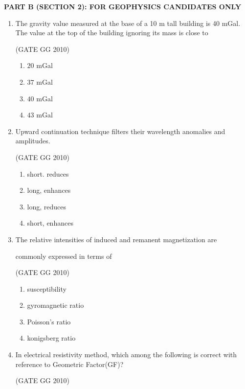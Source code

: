 \documentclass[journal]{IEEEtran}
\begin{document}
\vspace{1cm}
\textbf{PART B (SECTION 2): FOR GEOPHYSICS CANDIDATES ONLY}
\begin{enumerate}[start=26]
    \item The gravity value measured at the base of a 10 m tall building is 40 mGal. The value at the top of the building ignoring its mass is close to
    
\hfill{(GATE GG 2010)}

\begin{enumerate}
    \item $20$ mGal
\item  $37$ mGal
\item $40$ mGal
\item $43$ mGal
\end{enumerate}
\item Upward continuation technique filters their wavelength anomalies and amplitudes.

\hfill{(GATE GG 2010)}

\begin{enumerate}
    \item short. reduces

\item long, enhances

\item long, reduces
\item  short, enhances
\end{enumerate}

\item The relative intensities of induced and remanent magnetization are 

commonly expressed in terms of

\hfill{(GATE GG 2010)}
\begin{enumerate}
    \item  susceptibility

\item  gyromagnetic ratio

\item  Poisson's ratio

\item konigsberg ratio
 
\end{enumerate}
\item  In electrical resistivity method, which among the following is correct with reference to Geometric Factor(GF)? 

\hspace*{15.7cm}(GATE GG 2010)


\end{enumerate}
\end{document}
